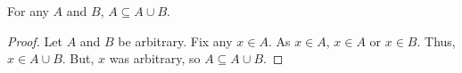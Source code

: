 \guard




\begin{prop}
\label{prop:unionIsAdditive}
  For any $A$ and $B$, $A\subseteq A\cup B$.
\end{prop}
\begin{proof}
  Let $A$ and $B$ be arbitrary.
  Fix any $x\in A$.
  As $x\in A$, $x\in A$ or $x\in B$.
  Thus, $x\in A\cup B$.
  But, $x$ was arbitrary, so $A\subseteq A\cup B$.
\end{proof}
